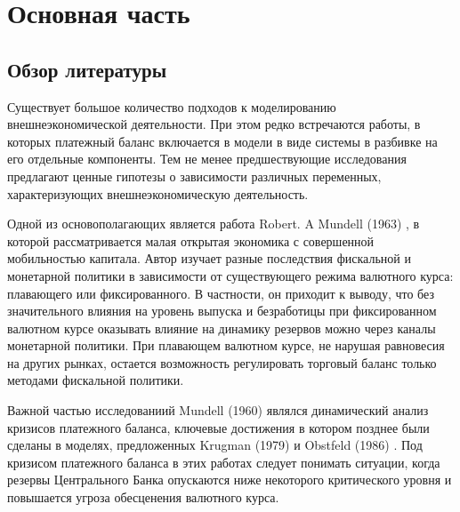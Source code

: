 \documentclass[a4paper, 14pt]{extarticle}
\begin{document}
\section{Основная часть}
\subsection{Обзор литературы}
Существует большое количество подходов к моделированию внешнеэкономической деятельности. 
При этом редко встречаются работы, в которых платежный баланс включается в модели в виде системы в разбивке на его отдельные компоненты.
Тем не менее предшествующие исследования предлагают ценные гипотезы о зависимости различных переменных, характеризующих внешнеэкономическую деятельность. 

Одной из основополагающих является работа Robert. A Mundell (1963) \autocite{mundell1963capital}, в которой рассматривается малая открытая экономика с совершенной мобильностью капитала.
Автор изучает разные последствия фискальной и монетарной политики в зависимости от существующего режима валютного курса: плавающего или фиксированного.
В частности, он приходит к выводу, что без значительного влияния на уровень выпуска и безработицы при фиксированном валютном курсе оказывать влияние на динамику резервов можно через каналы монетарной политики. 
При плавающем валютном курсе, не нарушая равновесия на других рынках, остается возможность регулировать торговый баланс только методами фискальной политики.

Важной частью исследованиий Mundell (1960) \autocite{mundell1960monetary} являлся динамический анализ кризисов платежного баланса, ключевые достижения в котором позднее были сделаны в моделях, предложенных Krugman (1979) \autocite{krugman1979model} и Obstfeld (1986) \autocite{obstfeld1986speculative}. 
Под кризисом платежного баланса в этих работах следует понимать ситуации, когда резервы Центрального Банка опускаются ниже некоторого критического уровня и повышается угроза обесценения валютного курса.
\end{document}
